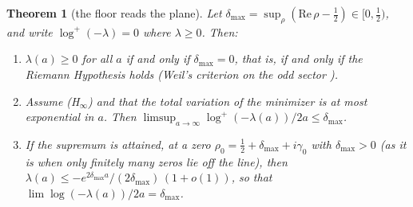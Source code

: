 \documentclass[11pt]{article}
\newtheorem{theorem}{Theorem}[section]
\theoremstyle{definition}
\theoremstyle{remark}
\begin{document}
\begin{theorem}[the floor reads the plane]\label{thm:plane}
Let $\delta_{\max}=\sup_\rho(\mathrm{Re}\,\rho-\tfrac12)\in[0,\tfrac12)$, and write $\log^+(-\lambda)=0$ where $\lambda\ge0$. Then:
\begin{enumerate}
\item[(i)] $\lambda(a)\ge0$ for all $a$ if and only if $\delta_{\max}=0$, that is, if and only if the Riemann Hypothesis holds (Weil's criterion on the odd sector \cite{bombieri}).
\item[(ii)] Assume (H$_\infty$) and that the total variation of the minimizer is at most exponential in $a$. Then $\limsup_{a\to\infty}\log^+(-\lambda(a))/2a\le\delta_{\max}$.
\item[(iii)] If the supremum is attained, at a zero $\rho_0=\tfrac12+\delta_{\max}+i\gamma_0$ with $\delta_{\max}>0$ (as it is when only finitely many zeros lie off the line), then $\lambda(a)\le-e^{2\delta_{\max}a}/(2\delta_{\max})\,(1+o(1))$, so that $\lim\log(-\lambda(a))/2a=\delta_{\max}$.
\end{enumerate}
\end{theorem}
\end{document}
